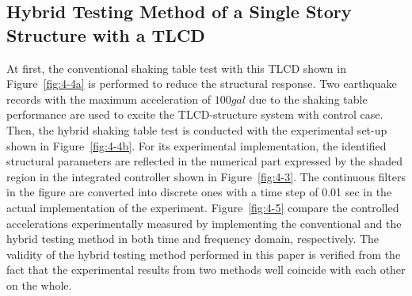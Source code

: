 







\subsection{Hybrid Testing Method of a Single Story Structure with a TLCD}
At first, the conventional shaking table test with this TLCD shown in Figure~\ref{fig:4-4a} is performed to reduce the structural response. Two earthquake records with the maximum acceleration of $100gal$ due to the shaking table performance are used to excite the TLCD-structure system with control case. Then, the hybrid shaking table test is conducted with the experimental set-up shown in Figure~\ref{fig:4-4b}. For its experimental implementation, the identified structural parameters are reflected in the numerical part expressed by the shaded region in the integrated controller shown in Figure~\ref{fig:4-3}. The continuous filters in the figure are converted into discrete ones with a time step of 0.01 sec in the actual implementation of the experiment. Figure~\ref{fig:4-5} compare the controlled accelerations experimentally measured by implementing the conventional and the hybrid testing method in both time and frequency domain, respectively. The validity of the hybrid testing method performed in this paper is verified from the fact that the experimental results from two methods well coincide with each other on the whole.

